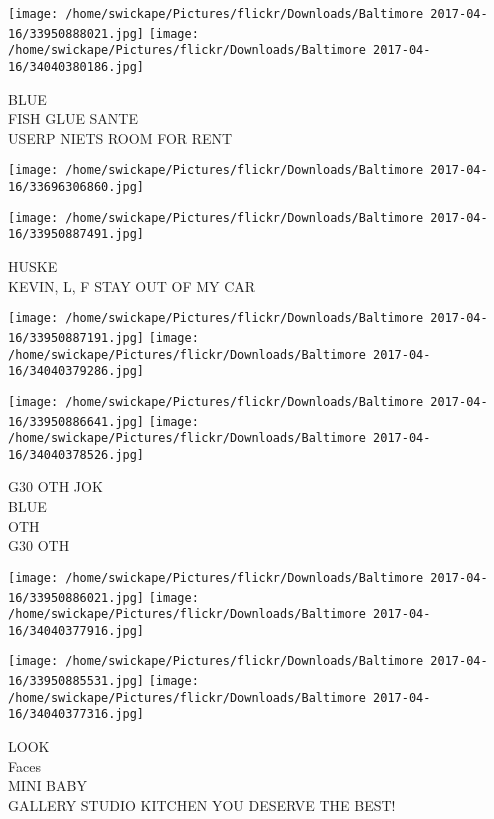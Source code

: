 \documentclass[10pt,letterpaper]{article}
\begin{document}
\vspace{0.25in}
\texttt{[image: /home/swickape/Pictures/flickr/Downloads/Baltimore 2017-04-16/33950888021.jpg]}
\texttt{[image: /home/swickape/Pictures/flickr/Downloads/Baltimore 2017-04-16/34040380186.jpg]}

BLUE\\
FISH GLUE SANTE\\
USERP NIETS ROOM FOR RENT\\
\pagebreak

\texttt{[image: /home/swickape/Pictures/flickr/Downloads/Baltimore 2017-04-16/33696306860.jpg]}

\vspace{0.25in}
\texttt{[image: /home/swickape/Pictures/flickr/Downloads/Baltimore 2017-04-16/33950887491.jpg]}

HUSKE\\
KEVIN, L, F STAY OUT OF MY CAR\\
\pagebreak

\texttt{[image: /home/swickape/Pictures/flickr/Downloads/Baltimore 2017-04-16/33950887191.jpg]}
\texttt{[image: /home/swickape/Pictures/flickr/Downloads/Baltimore 2017-04-16/34040379286.jpg]}

\texttt{[image: /home/swickape/Pictures/flickr/Downloads/Baltimore 2017-04-16/33950886641.jpg]}
\texttt{[image: /home/swickape/Pictures/flickr/Downloads/Baltimore 2017-04-16/34040378526.jpg]}

G30 OTH JOK\\
BLUE\\
OTH\\
G30 OTH\\
\pagebreak

\texttt{[image: /home/swickape/Pictures/flickr/Downloads/Baltimore 2017-04-16/33950886021.jpg]}
\texttt{[image: /home/swickape/Pictures/flickr/Downloads/Baltimore 2017-04-16/34040377916.jpg]}

\texttt{[image: /home/swickape/Pictures/flickr/Downloads/Baltimore 2017-04-16/33950885531.jpg]}
\texttt{[image: /home/swickape/Pictures/flickr/Downloads/Baltimore 2017-04-16/34040377316.jpg]}

LOOK\\
Faces\\
MINI BABY\\
GALLERY STUDIO KITCHEN YOU DESERVE THE BEST!\\
\pagebreak
\end{document}
